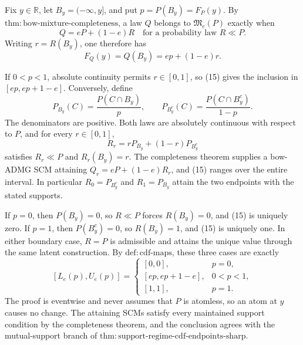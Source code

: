 Fix \(y\in\mathbb R\), let \(B_y=(-\infty,y]\), and put \(p=P(B_y)=F_P(y)\).  By \(\mathrm{thm:bow\text{-}mixture\text{-}completeness}\), a law \(Q\) belongs to \(\mathfrak M_e(P)\) exactly when
\[
 Q=eP+(1-e)R\quad\text{for a probability law }R\ll P.
\]
Writing \(r=R(B_y)\), one therefore has
\[
 F_Q(y)=Q(B_y)=ep+(1-e)r. \tag{15}
\]

If \(0<p<1\), absolute continuity permits \(r\in[0,1]\), so (15) gives the inclusion in \([ep,ep+1-e]\).  Conversely, define
\[
 P_{B_y}(C)=\frac{P(C\cap B_y)}p,
 \qquad
 P_{B_y^c}(C)=\frac{P(C\cap B_y^c)}{1-p}.
\]
The denominators are positive.  Both laws are absolutely continuous with respect to \(P\), and for every \(r\in[0,1]\),
\[
 R_r=rP_{B_y}+(1-r)P_{B_y^c}
\]
satisfies \(R_r\ll P\) and \(R_r(B_y)=r\).  The completeness theorem supplies a bow-ADMG SCM attaining \(Q_r=eP+(1-e)R_r\), and (15) ranges over the entire interval.  In particular \(R_0=P_{B_y^c}\) and \(R_1=P_{B_y}\) attain the two endpoints with the stated supports.

If \(p=0\), then \(P(B_y)=0\), so \(R\ll P\) forces \(R(B_y)=0\), and (15) is uniquely zero.  If \(p=1\), then \(P(B_y^c)=0\), so \(R(B_y)=1\), and (15) is uniquely one.  In either boundary case, \(R=P\) is admissible and attains the unique value through the same latent construction.  By \(\mathrm{def:cdf\text{-}maps}\), these three cases are exactly
\[
 [L_e(p),U_e(p)]=
 \begin{cases}
 [0,0],&p=0,\\
 [ep,ep+1-e],&0<p<1,\\
 [1,1],&p=1.
 \end{cases}
\]
The proof is eventwise and never assumes that \(P\) is atomless, so an atom at \(y\) causes no change.  The attaining SCMs satisfy every maintained support condition by the completeness theorem, and the conclusion agrees with the mutual-support branch of \(\mathrm{thm:support\text{-}regime\text{-}cdf\text{-}endpoints\text{-}sharp}\).
